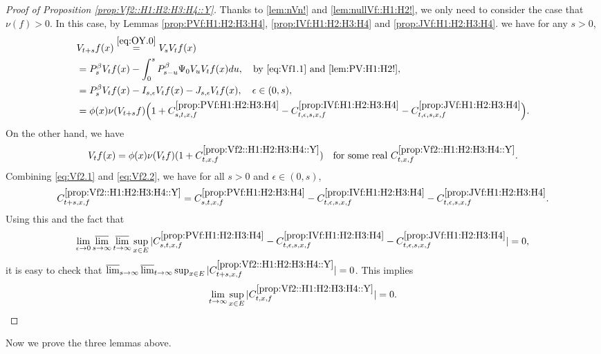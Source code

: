 \documentclass[12pt,a4paper]{amsart}
\numberwithin{equation}{section}
\theoremstyle{plain}
\theoremstyle{definition}
\theoremstyle{remark}
\begin{document}
\begin{proof}[{Proof of Proposition \ref{prop:Vf2::H1:H2:H3:H4::Y}}]
Thanks to \eqref{lem:nVn!} and \eqref{lem:nullVf::H1:H2!}, we only need to consider the case that $\nu(f)>0$.
	In this case,
by Lemmas \ref{prop:PVf:H1:H2:H3:H4}, \ref{prop:IVf:H1:H2:H3:H4} and \ref{prop:JVf:H1:H2:H3:H4}.
we have for any $s>0$,
\begin{align}
	& V_{t+s}f (x)
	\overset{\eqref{eq:OY.0}}= V_s V_t f(x)
	\\&= P_s^\beta V_t f(x) - \int_0^s P^\beta_{s-u}\Psi_0 V_uV_t f(x) du, \quad\text{by \eqref{eq:Vf1.1} and \eqref{lem:PV:H1:H2!}},
	\\&= P_s^\beta V_t f(x) - I_{s,\epsilon} V_tf(x) - J_{s,\epsilon} V_t f(x), \quad \epsilon\in (0,s),
	\\\label{eq:Vf2.1} &=\phi(x)\nu(V_{t+s}f) \Big( 1+ C^{\ref{prop:PVf:H1:H2:H3:H4}}_{s,t,x,f} - C^{\ref{prop:IVf:H1:H2:H3:H4}}_{t,\epsilon, s, x,f}- C^{\ref{prop:JVf:H1:H2:H3:H4}}_{t,\epsilon,s,x,f}\Big).
\end{align}
	On the other hand, we have
\begin{align}\label{eq:Vf2.2}
	V_{t}f (x)
	= \phi(x) \nu(V_{t}f) (1+ C^{\ref{prop:Vf2::H1:H2:H3:H4::Y}}_{t,x,f})
	\quad \text{for some real $C^{\ref{prop:Vf2::H1:H2:H3:H4::Y}}_{t,x,f}$}.
\end{align}
	Combining \eqref{eq:Vf2.1} and \eqref{eq:Vf2.2}, we have for all $s>0$ and $\epsilon \in (0,s)$,
\[
	C^{\ref{prop:Vf2::H1:H2:H3:H4::Y}}_{t+s,x,f} = C^{\ref{prop:PVf:H1:H2:H3:H4}}_{s,t,x,f} - C^{\ref{prop:IVf:H1:H2:H3:H4}}_{t,\epsilon, s, x,f}- C^{\ref{prop:JVf:H1:H2:H3:H4}}_{t,\epsilon,s,x,f}.
\]
	 Using this and the fact that
\[
	\lim_{\epsilon \to 0}\varlimsup_{s\to \infty}\varlimsup_{t\to \infty}\sup_{x\in E}|C^{\ref{prop:PVf:H1:H2:H3:H4}}_{s,t,x,f} - C^{\ref{prop:IVf:H1:H2:H3:H4}}_{t,\epsilon, s, x,f}- C^{\ref{prop:JVf:H1:H2:H3:H4}}_{t,\epsilon,s,x,f}|=0,
\]
	it is easy to check that $\varlimsup_{s\to \infty}\varlimsup_{t\to \infty}\sup_{x\in E}|C^{\ref{prop:Vf2::H1:H2:H3:H4::Y}}_{t+s,x,f}|=0$.
	This implies
\[
	\lim_{t\to \infty} \sup_{x\in E}|C^{\ref{prop:Vf2::H1:H2:H3:H4::Y}}_{t,x,f}|=0.
	\qedhere
\]
\end{proof}

	Now we prove the three lemmas above.
\end{document}
